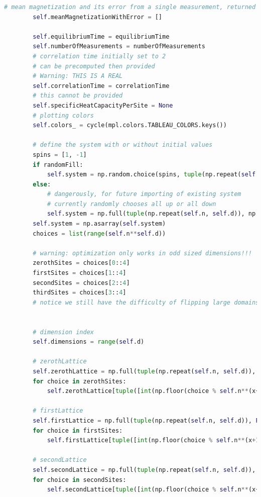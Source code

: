 \documentclass[%
showkeys,
bibnotes,
amsmath,amssymb,
floatfix,
]{revtex4-1}
\begin{document}
\begin{lstlisting}[language=Python]
        # mean magnetization and its error from a single measurement, returned as a 2 element list
        self.meanMagnetizationWithError = []

        self.equilibriumTime = equilibriumTime
        self.numberOfMeasurements = numberOfMeasurements
        # correlation time initially set to 2
        # can be precomputed then provided
        # Warning: THIS IS A REAL
        self.correlationTime = correlationTime
        # this cannot be provided
        self.specificHeatCapacityPerSite = None
        # plotting colors
        self.colors_ = cycle(mpl.colors.TABLEAU_COLORS.keys())

        # define the system with or without initial values
        spins = [1, -1]
        if randomFill:
            self.system = np.random.choice(spins, tuple(np.repeat(self.n, self.d)))
        else:
            # dangerously, for future importing of existing system
            # currently randomly chooses all up or all down
            self.system = np.full(tuple(np.repeat(self.n, self.d)), np.choose(1, [1, -1]))
        self.system = np.asarray(self.system)
        choices = list(range(self.n**self.d))

        # warning: optimization only works in odd sized dimensions!!!
        zerothSites = choices[0::4]
        firstSites = choices[1::4]
        secondSites = choices[2::4]
        thirdSites = choices[3::4]
        # notice we still have the difficulty of flipping large domains with smooth boundaries at especially low temperatures


        # dimension index
        self.dimensions = range(self.d)

        # zerothLattice
        self.zerothLattice = np.full(tuple(np.repeat(self.n, self.d)), False)
        for choice in zerothSites:
            self.zerothLattice[tuple([int(np.floor(choice % self.n**(x+1) / self.n**x)) for x in self.dimensions])] = True

        # firstLattice
        self.firstLattice = np.full(tuple(np.repeat(self.n, self.d)), False)
        for choice in firstSites:
            self.firstLattice[tuple([int(np.floor(choice % self.n**(x+1) / self.n**x)) for x in self.dimensions])] = True

        # secondLattice
        self.secondLattice = np.full(tuple(np.repeat(self.n, self.d)), False)
        for choice in secondSites:
            self.secondLattice[tuple([int(np.floor(choice % self.n**(x+1) / self.n**x)) for x in self.dimensions])] = True


\end{lstlisting}
\end{document}

